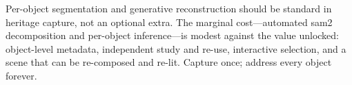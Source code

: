 \begin{recommendation}
Per-object segmentation and generative reconstruction should be standard in heritage capture, not an optional extra. The marginal cost---automated \acrshort{sam}2 decomposition and per-object inference---is modest against the value unlocked: object-level metadata, independent study and re-use, interactive selection, and a scene that can be re-composed and re-lit. Capture once; address every object forever.
\end{recommendation}
